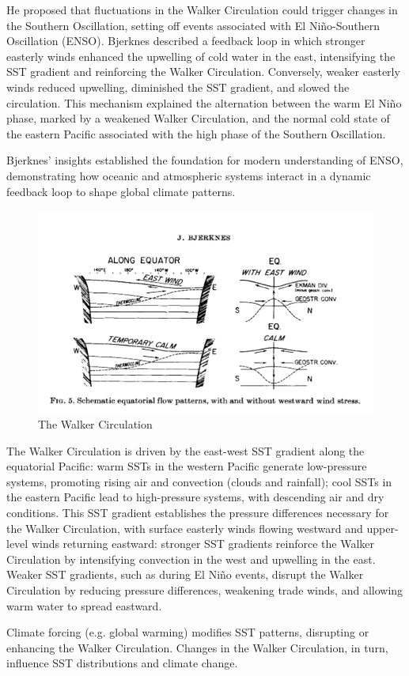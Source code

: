 He proposed that fluctuations in the Walker Circulation could trigger changes in the Southern Oscillation, setting off events associated with El Niño-Southern Oscillation (ENSO). Bjerknes described a feedback loop in which stronger easterly winds enhanced the upwelling of cold water in the east, intensifying the SST gradient and reinforcing the Walker Circulation. Conversely, weaker easterly winds reduced upwelling, diminished the SST gradient, and slowed the circulation. This mechanism explained the alternation between the warm El Niño phase, marked by a weakened Walker Circulation, and the normal cold state of the eastern Pacific associated with the high phase of the Southern Oscillation.

Bjerknes’ insights established the foundation for modern understanding of ENSO, demonstrating how oceanic and atmospheric systems interact in a dynamic feedback loop to shape global climate patterns.
\begin{figure}[htpb]
    \centering
    \includegraphics[width=0.35\linewidth]{uploads/Screenshot 2024-11-24 191635.png}
    \caption{The Walker Circulation}

\end{figure}
The Walker Circulation is driven by the east-west SST gradient along the equatorial Pacific: warm SSTs in the western Pacific generate low-pressure systems, promoting rising air and convection (clouds and rainfall); cool SSTs in the eastern Pacific lead to high-pressure systems, with descending air and dry conditions.
This SST gradient establishes the pressure differences necessary for the Walker Circulation, with surface easterly winds flowing westward and upper-level winds returning eastward: stronger SST gradients reinforce the Walker Circulation by intensifying convection in the west and upwelling in the east. Weaker SST gradients, such as during El Niño events, disrupt the Walker Circulation by reducing pressure differences, weakening trade winds, and allowing warm water to spread eastward.

Climate forcing (e.g. global warming) modifies SST patterns, disrupting or enhancing the Walker Circulation. Changes in the Walker Circulation, in turn, influence SST distributions and climate change.
